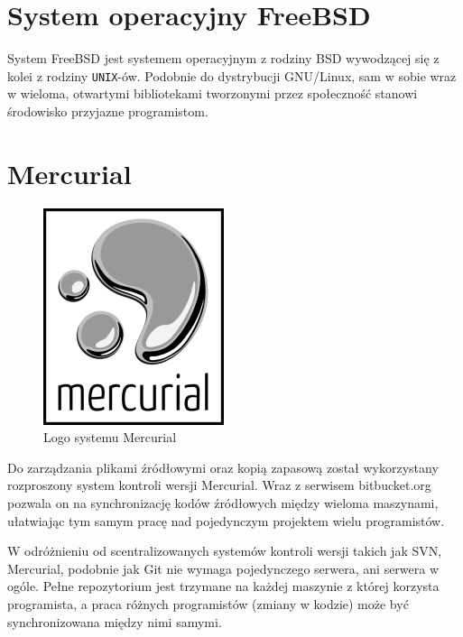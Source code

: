 \section{System operacyjny FreeBSD}
\par
System FreeBSD jest systemem operacyjnym z rodziny BSD wywodzącej się z kolei z rodziny \texttt{UNIX}-ów. Podobnie do dystrybucji GNU/Linux, sam w sobie wraz w wieloma, otwartymi bibliotekami tworzonymi przez społeczność stanowi środowisko przyjazne programistom.

\section{Mercurial}
\begin{figure}
\begin{center}
\includegraphics[scale=0.70]{img/mercurial_logo.png}
\end{center}
\caption{Logo systemu Mercurial}
\end{figure}
\par
Do zarządzania plikami źródłowymi oraz kopią zapasową został wykorzystany rozproszony system kontroli wersji Mercurial. Wraz z serwisem bitbucket.org pozwala on na synchronizację kodów źródłowych między wieloma maszynami, ułatwiając tym samym pracę nad pojedynczym projektem wielu programistów.
\par
W odróżnieniu od scentralizowanych systemów kontroli wersji takich jak SVN, Mercurial, podobnie jak Git nie wymaga pojedynczego serwera, ani serwera w ogóle. Pełne repozytorium jest trzymane na każdej maszynie z której korzysta programista, a praca różnych programistów (zmiany w kodzie) może być synchronizowana między nimi samymi.


